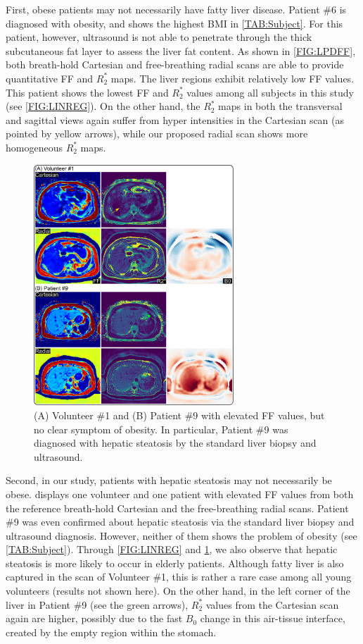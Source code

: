 \documentclass[journal,twoside,web]{ieeecolor}
\begin{document}
First, obese patients may not necessarily have fatty liver disease. 
Patient \#6 is diagnosed with obesity, 
and shows the highest BMI in \cref{TAB:Subject}. 
For this patient, however, ultrasound is not able to penetrate through 
the thick subcutaneous fat layer to assess the liver fat content. 
As shown in \cref{FIG:LPDFF}, 
both breath-hold Cartesian and free-breathing radial scans are able to 
provide quantitative FF and $R_2^*$ maps. The liver regions exhibit 
relatively low FF values. 
This patient shows the lowest FF and $R_2^*$ values 
among all subjects in this study (see \cref{FIG:LINREG}). 
On the other hand, the $R_2^*$ maps 
in both the transversal and sagittal views 
again suffer from hyper intensities in the Cartesian scan 
(as pointed by yellow arrows), 
while our proposed radial scan shows more homogeneous $R_2^*$ maps. 


\begin{figure}
	\centering
	\includegraphics[width=0.67\textwidth]{../../figures/tan9.pdf}
	\caption{(A) Volunteer \#1 and (B) Patient \#9 
		with elevated FF values, but no clear symptom of obesity.
		In particular, Patient \#9 was diagnosed with hepatic steatosis 
		by the standard liver biopsy and ultrasound.}
	\label{FIG:HPDFF}
\end{figure}

Second, in our study, patients with hepatic steatosis may not necessarily be obese. 
 displays one volunteer and one patient with elevated FF values from 
both the reference breath-hold Cartesian and the free-breathing radial 
scans. Patient \#9 was even confirmed about hepatic steatosis via 
the standard liver biopsy and ultrasound diagnosis. 
However, neither of them shows the problem of obesity (see \cref{TAB:Subject}). 
Through \cref{FIG:LINREG} and \cref{FIG:HPDFF}, 
we also observe that hepatic steatosis is more likely to occur in elderly patients. 
Although fatty liver is also captured in the scan of Volunteer \#1, 
this is rather a rare case among all young volunteers (results not shown here). 
On the other hand, in the left corner of the liver in Patient \#9 
(see the green arrows), 
$R_2^*$ values from the Cartesian scan again are higher, 
possibly due to the fast $B_0$ change in this air-tissue interface, 
created by the empty region within the stomach.
\end{document}
